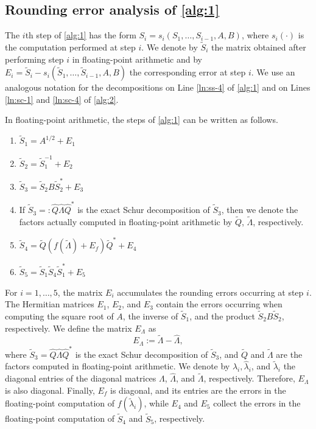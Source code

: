 \documentclass[DIV=14]{scrartcl}
\theoremstyle{thmstyletwo}
\theoremstyle{definition}
\numberwithin{equation}{section}
\newcommand{\wh}{\widehat}
\newcommand{\wt}{\widetilde}
\newcommand{\deq}{\ensuremath{:=}}
\newcommand{\deqr}{\ensuremath{=:}}
\renewcommand{\Lambda}{\varLambda}
\begin{document}
\subsection{Rounding error analysis of \cref{alg:1}}\label{sec:alg1}
{
The $i$th step of \cref{alg:1} has the form $S_i = s_i(S_1,\ldots,S_{i-1},A,B)$, where $s_i(\cdot)$ is the computation performed at step $i$.  We denote by $\widetilde S_i$ the matrix obtained after performing step $i$ in floating-point arithmetic and by $E_i = \widetilde S_i - s_i(\widetilde S_1,\ldots,\widetilde S_{i-1},A,B)$ the corresponding error at step $i$. We use an analogous notation for the decompositions on Line \ref{ln:ss-4} of \cref{alg:1} and on Lines \ref{ln:sc-1} and \ref{ln:sc-4} of \cref{alg:2}.

In floating-point arithmetic, the steps of \cref{alg:1} can be written as follows.
\begin{enumerate}
    \item $\widetilde S_1=A^{1/2}+E_1$
    \item $\widetilde S_2=\widetilde S_1^{-1}+E_2$\label{it:mstep-2}
    \item $\widetilde S_3=\widetilde S_2B\widetilde S_2^*+E_3$
    \item If $\widetilde S_3\deqr{}\widehat Q \widehat \Lambda  \widehat Q^*$ is the exact Schur decomposition of $\widetilde S_3$, then we denote the factors actually computed in floating-point arithmetic by $\wt Q$, $\wt \Lambda$, respectively.\label{it:mstep-4}
    \item $\widetilde S_4=\widetilde Q(f(\widetilde \Lambda )+E_f)\widetilde Q^*+E_4$
    \item $\widetilde S_5=\widetilde S_1\widetilde S_4 \widetilde S_1^*+E_5$\label{it:mstep-6}
\end{enumerate}
For $i = 1, \dots, 5$, the matrix $E_i$ accumulates the rounding errors occurring at step $i$. The Hermitian matrices $E_1$, $E_2$, and $E_3$ contain the errors occurring when computing the square root of $A$, the inverse of $\widetilde S_1$, and the product $\widetilde S_2B\widetilde S_2$, respectively.
We define the matrix $E_\Lambda $ as
\begin{equation}\label{eq:eq}
E_\Lambda \deq{} \wt \Lambda -\wh \Lambda,
\end{equation}
where $\widetilde S_3=\widehat Q\widehat \Lambda \widehat Q^*$ is the exact Schur decomposition of $\widetilde S_3$, and $\wt Q$ and $\wt \Lambda$ are the factors computed in floating-point arithmetic.
We denote by $\lambda_i,\wh\lambda_i$, and $\wt \lambda_i$ the diagonal entries of the diagonal matrices $\Lambda$, $\wh\Lambda$, and $\wt\Lambda$, respectively.
Therefore, $E_\Lambda$ is also diagonal.
Finally, $E_f$ is diagonal, and its entries are the errors in the floating-point computation of $f(\wt \lambda_i)$, while $E_4$ and $E_5$ collect the errors in the floating-point computation of $\widetilde S_4$ and $\widetilde S_5$, respectively.

}
\end{document}
